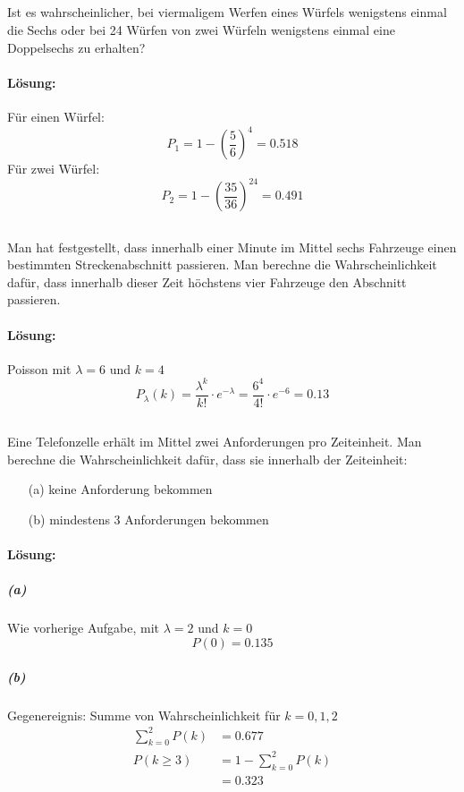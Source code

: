 \documentclass[ngerman]{scrartcl}
\begin{document}
\subsection{}
Ist es wahrscheinlicher, bei viermaligem Werfen eines Würfels wenigstens einmal die Sechs oder bei 24 Würfen von zwei Würfeln wenigstens einmal eine Doppelsechs zu erhalten?
\paragraph{Lösung:}
Für einen Würfel:
\begin{equation}
P_1 = 1- \left(\frac{5}{6}\right)^{4} = 0.518
\end{equation}
Für zwei Würfel:
\begin{equation}
P_2 = 1- \left(\frac{35}{36}\right)^{24} = 0.491
\end{equation}

\subsection{}
Man hat festgestellt, dass innerhalb einer Minute im Mittel sechs Fahrzeuge einen bestimmten Streckenabschnitt passieren. Man berechne die Wahrscheinlichkeit dafür, dass innerhalb dieser Zeit höchstens vier Fahrzeuge den Abschnitt passieren.
\paragraph{Lösung:}
Poisson mit $\lambda = 6$ und $k= 4$
\begin{equation}
P_\lambda(k) = \frac{\lambda^{k}}{k!}\cdot e^{-\lambda} = \frac{6^{4}}{4!}\cdot e^{-6} = 0.13
\end{equation}

\subsection{}
Eine Telefonzelle erhält im Mittel zwei Anforderungen pro Zeiteinheit. Man berechne die Wahrscheinlichkeit dafür, dass sie innerhalb der Zeiteinheit:
\begin{enumerate}
\item[(a)] keine Anforderung bekommen
\item[(b)] mindestens 3 Anforderungen bekommen
\end{enumerate}
\paragraph{Lösung:}
\subparagraph{(a)}
Wie vorherige Aufgabe, mit $\lambda=2$ und $k=0$\[ P(0) = 0.135\]
\subparagraph{(b)}
Gegenereignis: Summe von Wahrscheinlichkeit für $k=0,1,2$
\begin{align*}
\sum_{k=0}^2{P(k)} &= 0.677 \\
P(k\geq 3) &= 1 - \sum_{k=0}^2{P(k)} \\
&= 0.323
\end{align*}
\end{document}
